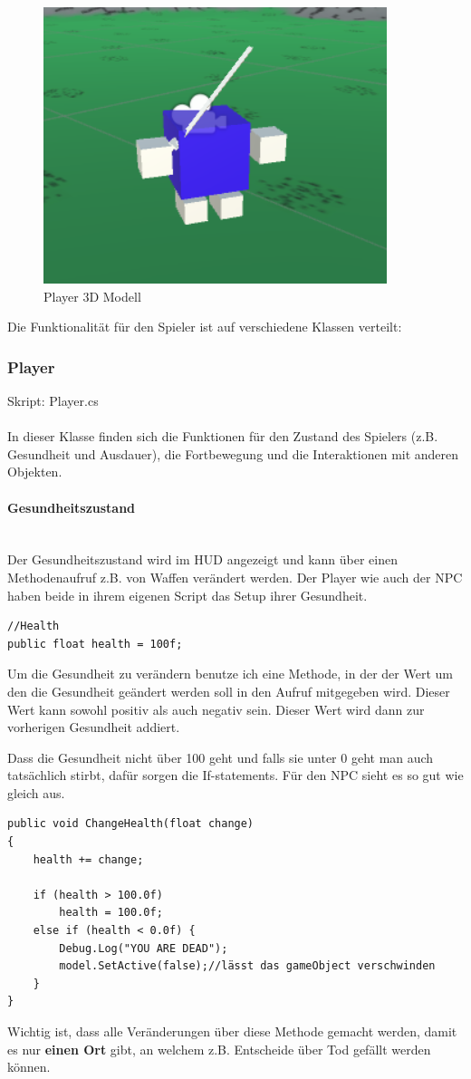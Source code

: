 \begin{figure}[H]
\includegraphics[scale=1]{screenshots/player.png}
\caption{Player 3D Modell}
\end{figure}

Die Funktionalität für den Spieler ist auf verschiedene Klassen verteilt:

\subsubsection{Player}
Skript: Player.cs\\\\
In dieser Klasse finden sich die Funktionen für den Zustand des Spielers (z.B. Gesundheit und Ausdauer), die Fortbewegung und die Interaktionen mit anderen Objekten.

\paragraph{Gesundheitszustand}\mbox{} \\
Der Gesundheitszustand wird im HUD angezeigt und kann über einen Methodenaufruf z.B. von Waffen verändert werden.
Der Player wie auch der NPC haben beide in ihrem eigenen Script das Setup ihrer Gesundheit.
\begin{lstlisting}[caption={Gesundheit als öffentliche Variable}]
//Health
public float health = 100f;
\end{lstlisting}
Um die Gesundheit zu verändern benutze ich eine Methode, in der der Wert um den die Gesundheit geändert werden soll in den Aufruf mitgegeben wird. Dieser Wert kann sowohl positiv als auch negativ sein.
Dieser Wert wird dann zur vorherigen Gesundheit addiert.

Dass die Gesundheit nicht über 100 geht und falls sie unter 0 geht man auch tatsächlich stirbt, dafür sorgen die If-statements. Für den NPC sieht es so gut wie gleich aus.
\begin{lstlisting}
public void ChangeHealth(float change)
{
	health += change;

	if (health > 100.0f)
		health = 100.0f;
	else if (health < 0.0f) {
		Debug.Log("YOU ARE DEAD");
		model.SetActive(false);//lässt das gameObject verschwinden
	}
}
\end{lstlisting}
Wichtig ist, dass alle Veränderungen über diese Methode gemacht werden, damit es nur \textbf{einen Ort} gibt, an welchem z.B. Entscheide über Tod gefällt werden können.

